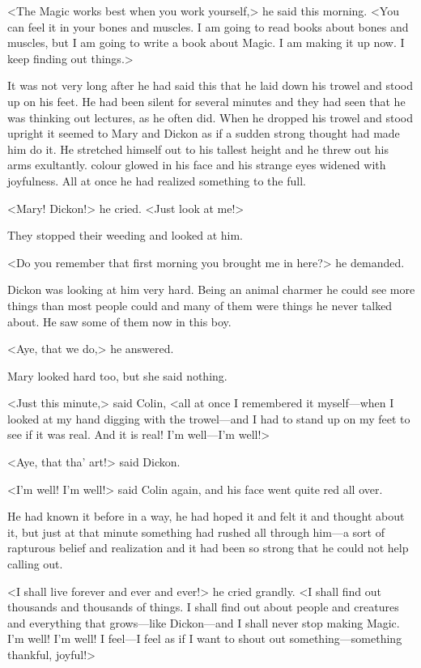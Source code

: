 <The Magic works best when you work yourself,> he said this morning. <You can feel it in your bones and muscles. I am going to read books about bones and muscles, but I am going to write a book about Magic. I am making it up now. I keep finding out things.>

It was not very long after he had said this that he laid down his trowel and stood up on his feet. He had been silent for several minutes and they had seen that he was thinking out lectures, as he often did. When he dropped his trowel and stood upright it seemed to Mary and Dickon as if a sudden strong thought had made him do it. He stretched himself out to his tallest height and he threw out his arms exultantly. colour glowed in his face and his strange eyes widened with joyfulness. All at once he had realized something to the full.

<Mary! Dickon!> he cried. <Just look at me!>

They stopped their weeding and looked at him.

<Do you remember that first morning you brought me in here?> he demanded.

Dickon was looking at him very hard. Being an animal charmer he could see more things than most people could and many of them were things he never talked about. He saw some of them now in this boy.

<Aye, that we do,> he answered.

Mary looked hard too, but she said nothing.

<Just this minute,> said Colin, <all at once I remembered it myself—when I looked at my hand digging with the trowel—and I had to stand up on my feet to see if it was real. And it is real! I'm well—I'm well!>

<Aye, that tha' art!> said Dickon.

<I'm well! I'm well!> said Colin again, and his face went quite red all over.

He had known it before in a way, he had hoped it and felt it and thought about it, but just at that minute something had rushed all through him—a sort of rapturous belief and realization and it had been so strong that he could not help calling out.

<I shall live forever and ever and ever!> he cried grandly. <I shall find out thousands and thousands of things. I shall find out about people and creatures and everything that grows—like Dickon—and I shall never stop making Magic. I'm well! I'm well! I feel—I feel as if I want to shout out something—something thankful, joyful!>

